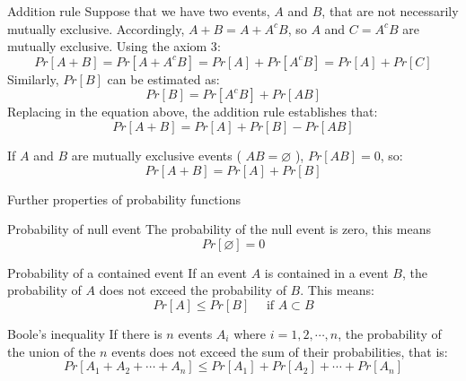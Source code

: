 \documentclass[8pt]{beamer}
\renewcommand{\emph}[1]{\textcolor{myorange}{#1}}
\begin{document}
\begin{frame}{Addition rule}
    Suppose that we have two events, $A$ and $B$, that are not necessarily mutually exclusive. Accordingly, $A + B = A + A^c B$, so $A$ and $C = A^c B$ are mutually exclusive. Using the \emph{axiom 3}:
    $$
    Pr[A + B] = Pr[A + A^c B] = Pr[A] + Pr[A^c B] = Pr[A] + Pr[C]
    $$
    Similarly, $Pr[B]$ can be estimated as:
    $$
    Pr[B] = Pr[A^c B] + Pr[AB]
    $$
    Replacing in the equation above, the \emph{addition rule} establishes that:
    $$
    Pr[A + B] =  Pr[A] + Pr[B] - Pr[AB]
    $$

    If $A$ and $B$ are \emph{mutually exclusive} events ( $AB = \varnothing$ ), $Pr[AB] = 0$, so:
    $$
    Pr[A + B]  = Pr[A] + Pr[B]
    $$
\end{frame}

\begin{frame}{Further properties of probability functions}

    \begin{block}{Probability of null event}
        The probability of the \emph{null} event is zero, this means
        $$
        Pr[\varnothing] = 0
        $$
    \end{block}
    \begin{block}{Probability of a contained event}
        If an event $A$ is contained in a event $B$, the probability of $A$ does not exceed the probability of $B$. This means:
        $$
        Pr[A] \leq Pr[B] \quad \text{ if } A \subset B
        $$
    \end{block}
    \begin{block}{Boole's inequality}
        If there is $n$ events $A_i$ where $i = 1, 2, \cdots, n$, the probability of the union of the $n$ events does not exceed the sum of their probabilities, that is:
        $$
        Pr[A_1 + A_2 + \cdots + A_n] \leq Pr[A_1] + Pr[A_2] + \cdots + Pr[A_n]
        $$
    \end{block}
\end{frame}
\end{document}
